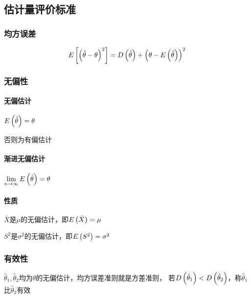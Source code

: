 \documentclass{article}
\begin{document}
\subsection{估计量评价标准}

\subsubsection{均方误差}

\[E\left[\left(\hat\theta-\theta\right)^2\right]=D\left(\hat\theta\right)+{\left(\theta-E\left(\hat\theta\right)\right)}^2\]

\subsubsection{无偏性}

\paragraph{无偏估计}$E\left(\hat\theta\right)=\theta$

否则为有偏估计

\paragraph{渐进无偏估计}$\lim\limits_{n\to\infty}E\left(\hat\theta\right)=\theta$

\paragraph{性质}

$\bar X$是$\mu$的无偏估计，即$E\left(\bar X\right)=\mu$

$S^2$是$\sigma^2$的无偏估计，即$E\left(S^2\right)=\sigma^2$

\subsubsection{有效性}

$\hat\theta_1,\hat\theta_2$均为$\theta$的无偏估计，均方误差准则就是方差准则，
若$D\left(\hat\theta_1\right)<D\left(\hat\theta_2\right)$，称$\hat\theta_1$比$\hat\theta_2$有效
\end{document}
